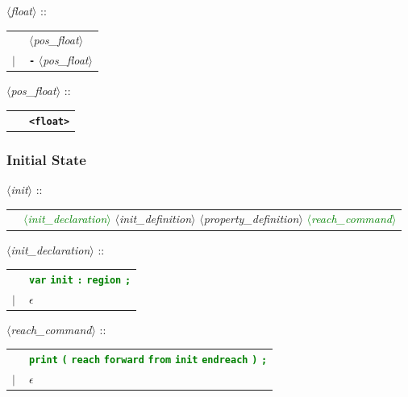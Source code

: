 \documentclass[a4paper,11pt]{article}
\newcommand{\emptystring}{$\epsilon$}
\newcommand{\nt}[1]{$\langle$\emph{#1}$\rangle$}
\newcommand{\regleGrammaire}[1]{\bigskip \noindent \nt{#1} :: \\}
\newcommand{\npec}[1]{\textcolor{green}{#1}}
\newcommand{\code}[1]{\textbf{\texttt{#1}}}
\begin{document}
\regleGrammaire{float}
\begin{tabular}{l l}
	\  & \nt{pos\_float} \\
	$|$ & \code{-} \nt{pos\_float}  \\
\end{tabular}


\regleGrammaire{pos\_float}
\begin{tabular}{l l}
	\  & \code{<float>} \\
\end{tabular}


\subsubsection{Initial State}

\regleGrammaire{init}
\begin{tabular}{l l}
	& \npec{\nt{init\_declaration}} \nt{init\_definition} \nt{property\_definition} \npec{\nt{reach\_command}} \\
\end{tabular}

\regleGrammaire{init\_declaration}
\begin{tabular}{l l}
	\  & \npec{\code{var} \code{init} \code{:} \code{region} \code{;}} \\
	$|$ & \emptystring \\
\end{tabular}

\regleGrammaire{reach\_command}
\begin{tabular}{l l}
	\  & \npec{\code{print} \code{(} \code{reach} \code{forward} \code{from} \code{init} \code{endreach} \code{)} \code{;}} \\
	$|$ & \emptystring \\
\end{tabular}
\end{document}
